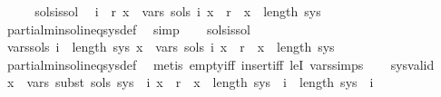 \begin{isabellebody}
%
\isadelimproof
%
\endisadelimproof
%
\isatagproof
{}\isamarkupfalse%
\ {\isacharminus}{\kern0pt}\isanewline
\ \ \isamarkupfalse%
\ sols{\isacharunderscore}{\kern0pt}is{\isacharunderscore}{\kern0pt}sol\ \isamarkupfalse%
\ {\isachardoublequoteopen}{\isasymforall}i\ {\isacharless}{\kern0pt}\ r{\isachardot}{\kern0pt}\ {\isasymforall}x\ {\isasymin}\ vars\ {\isacharparenleft}{\kern0pt}sols\ i{\isacharparenright}{\kern0pt}{\isachardot}{\kern0pt}\ x\ {\isasymge}\ r\ {\isasymand}\ x\ {\isacharless}{\kern0pt}\ length\ sys{\isachardoublequoteclose}\isanewline
\ \ \ \ \isamarkupfalse%
\ partial{\isacharunderscore}{\kern0pt}min{\isacharunderscore}{\kern0pt}sol{\isacharunderscore}{\kern0pt}ineq{\isacharunderscore}{\kern0pt}sys{\isacharunderscore}{\kern0pt}def\ \isamarkupfalse%
\ simp\isanewline
\ \ \isamarkupfalse%
\ sols{\isacharunderscore}{\kern0pt}is{\isacharunderscore}{\kern0pt}sol\ \isamarkupfalse%
\ vars{\isacharunderscore}{\kern0pt}sols{\isacharcolon}{\kern0pt}\ {\isachardoublequoteopen}{\isasymforall}i\ {\isacharless}{\kern0pt}\ length\ sys{\isachardot}{\kern0pt}\ {\isasymforall}x\ {\isasymin}\ vars\ {\isacharparenleft}{\kern0pt}sols\ i{\isacharparenright}{\kern0pt}{\isachardot}{\kern0pt}\ x\ {\isasymge}\ r\ {\isasymand}\ x\ {\isacharless}{\kern0pt}\ length\ sys{\isachardoublequoteclose}\isanewline
\ \ \ \ \isamarkupfalse%
\ partial{\isacharunderscore}{\kern0pt}min{\isacharunderscore}{\kern0pt}sol{\isacharunderscore}{\kern0pt}ineq{\isacharunderscore}{\kern0pt}sys{\isacharunderscore}{\kern0pt}def\ \isamarkupfalse%
\ {\isacharparenleft}{\kern0pt}metis\ empty{\isacharunderscore}{\kern0pt}iff\ insert{\isacharunderscore}{\kern0pt}iff\ leI\ vars{\isachardot}{\kern0pt}simps{\isacharparenleft}{\kern0pt}{}{\isacharparenright}{\kern0pt}{\isacharparenright}{\kern0pt}\isanewline
\ \ \isamarkupfalse%
\ sys{\isacharunderscore}{\kern0pt}valid\ \isamarkupfalse%
\ {\isachardoublequoteopen}{\isasymforall}x\ {\isasymin}\ vars\ {\isacharparenleft}{\kern0pt}subst\ sols\ {\isacharparenleft}{\kern0pt}sys\ {\isacharbang}{\kern0pt}\ i{\isacharparenright}{\kern0pt}{\isacharparenright}{\kern0pt}{\isachardot}{\kern0pt}\ x\ {\isasymge}\ r\ {\isasymand}\ x\ {\isacharless}{\kern0pt}\ length\ sys{\isachardoublequoteclose}\ \ {\isachardoublequoteopen}i\ {\isacharless}{\kern0pt}\ length\ sys{\isachardoublequoteclose}\ \ i\isanewline

\end{isabellebody}
